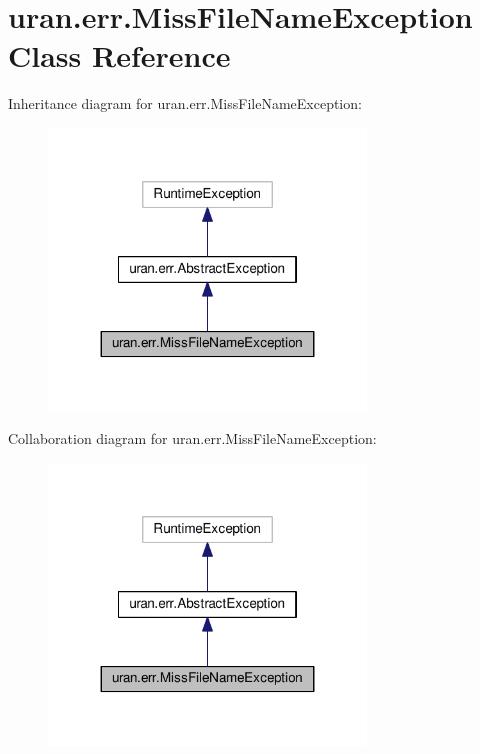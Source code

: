\hypertarget{classuran_1_1err_1_1_miss_file_name_exception}{}\section{uran.\+err.\+Miss\+File\+Name\+Exception Class Reference}
\label{classuran_1_1err_1_1_miss_file_name_exception}


Inheritance diagram for uran.\+err.\+Miss\+File\+Name\+Exception\+:
\nopagebreak
\begin{figure}[H]
\begin{center}
\leavevmode
\includegraphics[width=239pt]{classuran_1_1err_1_1_miss_file_name_exception__inherit__graph}
\end{center}
\end{figure}


Collaboration diagram for uran.\+err.\+Miss\+File\+Name\+Exception\+:
\nopagebreak
\begin{figure}[H]
\begin{center}
\leavevmode
\includegraphics[width=239pt]{classuran_1_1err_1_1_miss_file_name_exception__coll__graph}
\end{center}
\end{figure}
